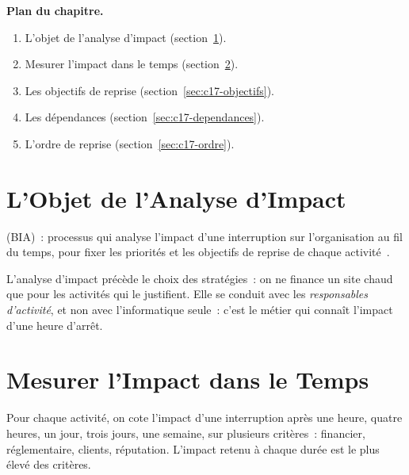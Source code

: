 \medskip
\textbf{Plan du chapitre.}
\begin{enumerate}
    \item L'objet de l'analyse d'impact (section~\ref{sec:c17-objet}).
    \item Mesurer l'impact dans le temps (section~\ref{sec:c17-temps}).
    \item Les objectifs de reprise (section~\ref{sec:c17-objectifs}).
    \item Les dépendances (section~\ref{sec:c17-dependances}).
    \item L'ordre de reprise (section~\ref{sec:c17-ordre}).
\end{enumerate}

\separateur

\section{L'Objet de l'Analyse d'Impact}
\label{sec:c17-objet}

\begin{boxdef}
 (BIA)~: processus qui analyse
l'impact d'une interruption sur l'organisation au fil du temps, pour fixer
les priorités et les objectifs de reprise de chaque
activité~\cite{iso22301_2019,iso22317_2021}.
\end{boxdef}

L'analyse d'impact précède le choix des stratégies~: on ne finance un site
chaud que pour les activités qui le justifient. Elle se conduit avec les
\emph{responsables d'activité}, et non avec l'informatique seule~: c'est le
métier qui connaît l'impact d'une heure d'arrêt.

\section{Mesurer l'Impact dans le Temps}
\label{sec:c17-temps}

Pour chaque activité, on cote l'impact d'une interruption après une heure,
quatre heures, un jour, trois jours, une semaine, sur plusieurs
critères~: financier, réglementaire, clients, réputation. L'impact retenu à
chaque durée est le plus élevé des critères.

